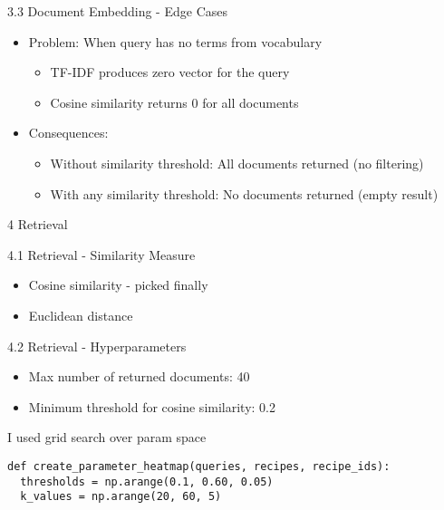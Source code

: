 \documentclass{beamer}
\begin{document}
\begin{frame}{3.3 Document Embedding - Edge Cases}
  \begin{itemize}
    \item Problem: When query has no terms from vocabulary
      \begin{itemize}
        \item TF-IDF produces zero vector for the query
        \item Cosine similarity returns 0 for all documents
      \end{itemize}
    \item Consequences:
      \begin{itemize}
        \item Without similarity threshold: All documents returned (no filtering)
        \item With any similarity threshold: No documents returned (empty result)
      \end{itemize}
  \end{itemize}
\end{frame}

\begin{frame}{4 Retrieval}
\end{frame}

\begin{frame}{4.1 Retrieval - Similarity Measure}
  \begin{itemize}
    \item Cosine similarity - picked finally
    \item Euclidean distance
  \end{itemize}
\end{frame}

\begin{frame}[fragile]{4.2 Retrieval - Hyperparameters}
  \begin{itemize}
    \item Max number of returned documents: 40
    \item Minimum threshold for cosine similarity: 0.2
  \end{itemize}
  I used grid search over param space

  \begin{verbatim}
def create_parameter_heatmap(queries, recipes, recipe_ids):
  thresholds = np.arange(0.1, 0.60, 0.05)
  k_values = np.arange(20, 60, 5)
  \end{verbatim}

\end{frame}
\end{document}
